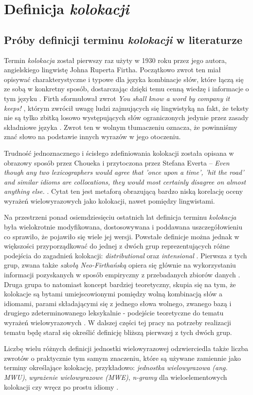 \chapter{Definicja \protect\textit{kolokacji}}


\section{Próby definicji terminu \protect\textit{kolokacji} w literaturze}
Termin \emph{kolokacja} został pierwszy raz użyty w 1930 roku przez jego autora, angielskiego lingwistę Johna Ruperta Firtha. 
Początkowo zwrot ten miał opisywać charakterystyczne i typowe dla języka kombinacje słów, które łączą się ze sobą w konkretny sposób, dostarczając dzięki temu cenną wiedzę i informacje o tym języku \cite[str. 15]{evert}.
Firth sformułował zwrot \emph{You shall know a word by company it keeps!} \cite{firth}, którym zwrócił uwagę ludzi zajmujących się lingwistyką na fakt, że teksty nie są tylko zbitką losowo występujących słów ograniczonych jedynie przez zasady składniowe języka \cite[str. 15]{evert}. Zwrot ten w wolnym tłumaczeniu oznacza, że powinniśmy znać słowo na podstawie innych wyrazów w jego otoczeniu.
\par
Trudność jednoznacznego i ścisłego zdefiniowania kolokacji została opisana w obrazowy sposób przez Choueka i przytoczona przez Stefana Everta -- \emph{Even though any two lexicographers would agree that 'once upon a time', 'hit the road' and similar idioms are collocations, they would most certainly disagree on almost anything else.} \cite[str. 15]{evert}.
Cytat ten jest metaforą obrazującą bardzo niską korelację oceny wyrażeń wielowyrazowych jako kolokacji, nawet pomiędzy lingwistami.
\par
Na przestrzeni ponad osiemdziesięciu ostatnich lat definicja terminu \emph{kolokacja} była wielokrotnie modyfikowana, dostosowywana i poddawana uszczegółowieniu co sprawiło, że pojawiło się wiele jej wersji. 
Powstałe definicje można jednak w większości przyporządkować do jednej z dwóch grup reprezentujących różne podejścia do zagadnień kolokacji: \emph{distributional} oraz \emph{intensional} \cite[str. 15]{evert}.
Pierwsza z tych grup, zwana także \emph{szkołą Neo-Firthańską} opiera się głównie na wykorzystaniu informacji pozyskanych w sposób empiryczny z przebadanych zbiorów danych \cite[str. 15]{evert}. 
Druga grupa to natomiast koncept bardziej teoretyczny, skupia się na tym, że kolokacje są bytami umiejscowionymi pomiędzy wolną kombinacją słów a idiomami, parami składającymi się z jednego słowa wolnego, zwanego bazą i drugiego zdeterminowanego leksykalnie - podejście teoretyczne do tematu wyrażeń wielowyrazowych \cite[str. 16]{evert}. 
W dalszej części tej pracy na potrzeby realizacji tematu będę starał się określić definicję bliższą pierwszej z tych dwóch grup.
\par
Liczbę wielu różnych definicji jednostki wielowyrazowej odzwierciedla także liczba zwrotów o praktycznie tym samym znaczeniu, które są używane zamiennie jako terminy określające kolokację, przykładowo: \emph{jednostka wielowyrazowa (ang. MWU)}, \emph{wyrażenie wielowyrazowe (MWE)}, \emph{n-gramy} dla wieloelementowych kolokacji czy wręcz po prostu idiomy \cite[str. 16]{evert}. 


